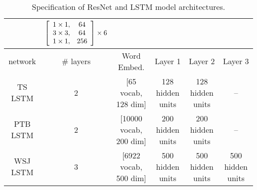 \begin{table}
\begin{small}
\begin{tabular}{c@{\hskip 0.1in} c@{\hskip 0.1in} c@{\hskip 0.1in} c@{\hskip 0.1in} c@{\hskip 0.1in} c}
	& $\left[\begin{array}{c c} 1 \times 1, & 64  \\ 3\times 3, & 64 \\ 1 \times 1, & 256  \end{array} \right]\times 6  $ 
		\\
	\midrule
	\midrule
	network & \# layers & Word Embed. & Layer 1 & Layer 2 & Layer 3 \\
	\midrule
	TS LSTM & 2 & [65 vocab, 128 dim] & 128 hidden units & 128 hidden units & --  \\
	\midrule
	PTB LSTM & 2 & [10000 vocab, 200 dim] & 200 hidden units & 200 hidden units & -- \\
	\midrule
	WSJ LSTM & 3 & [6922 vocab, 500 dim] & 500 hidden units & 500 hidden units & 500 hidden units\\
	\bottomrule
	\end{tabular}
\end{small}
\caption{Specification of ResNet and LSTM model architectures.}
\label{tab:model_specification}
\end{table}

